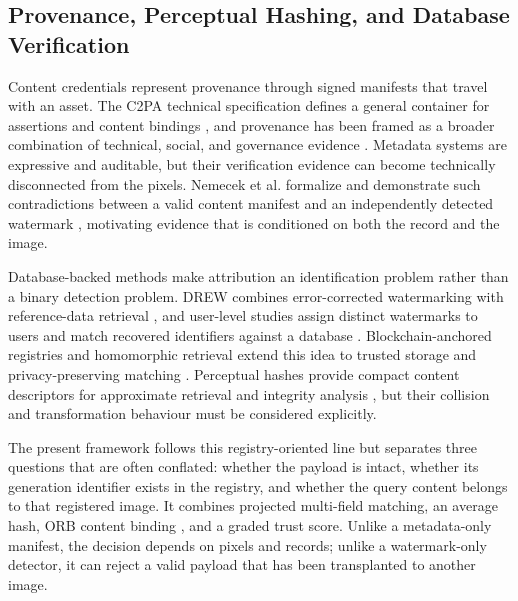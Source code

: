 \documentclass[a4paper,fleqn]{cas-sc}
\begin{document}
\subsection{Provenance, Perceptual Hashing, and Database Verification}
Content credentials represent provenance through signed manifests that travel
with an asset. The C2PA technical specification defines a general container for
assertions and content bindings \cite{noauthor_content_nodate}, and provenance
has been framed as a broader combination of technical, social, and governance
evidence \cite{collomosse_authenticity_2024}. Metadata systems are expressive
and auditable, but their verification evidence can become technically
disconnected from the pixels. Nemecek et al. formalize and demonstrate such
contradictions between a valid content manifest and an independently detected
watermark \cite{nemecek_authenticated_2026}, motivating evidence that is
conditioned on both the record and the image.

Database-backed methods make attribution an identification problem rather than
a binary detection problem. DREW combines error-corrected watermarking with
reference-data retrieval \cite{saberi_drew_2024}, and user-level studies assign
distinct watermarks to users and match recovered identifiers against a database
\cite{jiang_watermark-based_2026}. Blockchain-anchored registries and
homomorphic retrieval extend this idea to trusted storage and privacy-preserving
matching \cite{mohit_provenance_2026,singhi_provenance_2025}. Perceptual hashes
provide compact content descriptors for approximate retrieval and integrity
analysis \cite{sharma_distance_2024,wang_perceptual_2021}, but their collision
and transformation behaviour must be considered explicitly.

The present framework follows this registry-oriented line but separates three
questions that are often conflated: whether the payload is intact, whether its
generation identifier exists in the registry, and whether the query content
belongs to that registered image. It combines projected multi-field matching,
an average hash, ORB content binding \cite{rublee_orb_2011}, and a graded trust
score. Unlike a metadata-only manifest, the decision depends on pixels and
records; unlike a watermark-only detector, it can reject a valid payload that
has been transplanted to another image.
\end{document}
